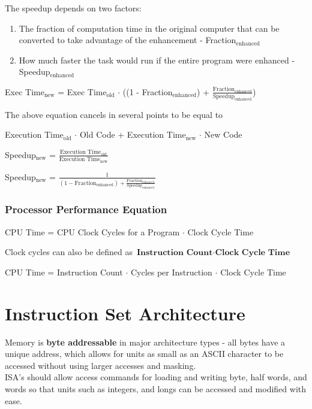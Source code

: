 \documentclass[11pt]{article}
\begin{document}
The speedup depends on two factors:

\begin{enumerate}
    \item The fraction of computation time in the original computer that can be converted to take advantage of the enhancement - Fraction$_{\text{enhanced}}$
    \item How much faster the task would run if the entire program were enhanced - Speedup$_{\text{enhanced}}$
\end{enumerate}

\begin{center}
    {Exec Time}$_\text{new}$ = {Exec Time}$_\text{old}$ $\cdot$ ((1 - Fraction$_\text{enhanced}$) + $\frac{\text{Fraction}_\text{enhanced}}{\text{Speedup}_\text{enhanced}}$)
\end{center}

The above equation cancels in several points to be equal to 

\begin{center}
    Execution Time$_\text{old}$ $\cdot$ Old Code + Execution Time$_\text{new}$ $\cdot$ New Code
\end{center}

\begin{center}
    {Speedup}$_\text{new}$ = $\frac{\text{Execution Time}_\text{old}}{\text{Execution Time}_\text{new}}$
\end{center}

\begin{center}
    {Speedup}$_\text{new}$ = $\frac{1}{(1-\text{Fraction}_\text{enhanced}) + \frac{\text{Fraction}_\text{enhanced}}{\text{Speedup}_\text{enhanced}}}$
\end{center}

\subsubsection{Processor Performance Equation}

\begin{center}
    CPU Time = CPU Clock Cycles for a Program $\cdot$ Clock Cycle Time
\end{center}

Clock cycles can also be defined as $\textbf{Instruction Count} \cdot \textbf{Clock Cycle Time}$

\begin{center}
    CPU Time = Instruction Count $\cdot$ Cycles per Instruction $\cdot$ Clock Cycle Time
\end{center}

\section{Instruction Set Architecture}

Memory is \textbf{byte addressable} in major architecture types - all bytes have a unique address, which allows for units as small as an ASCII character to be accessed without using larger accesses and masking. \\

ISA's should allow access commands for loading and writing byte, half words, and words so that units such as integers, and longs can be accessed and modified with ease. 
\end{document}
